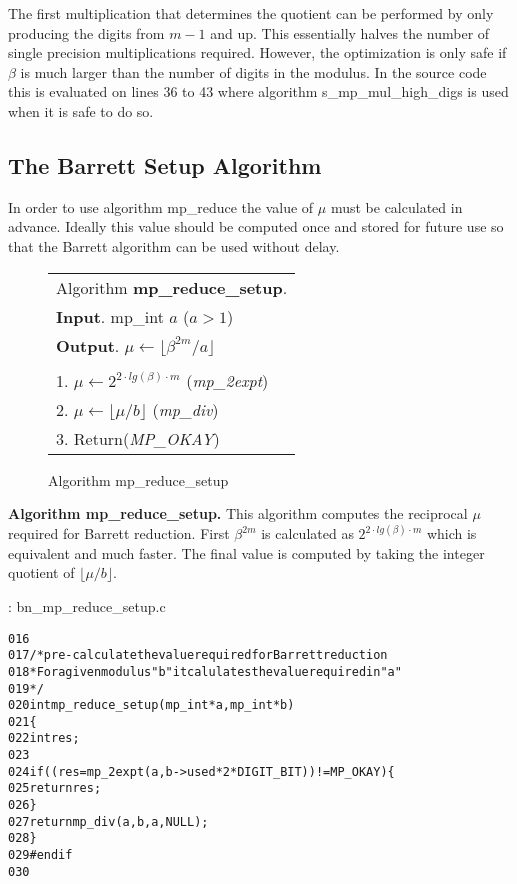 \documentclass[b5paper]{book}
\begin{document}
The first multiplication that determines the quotient can be performed by only producing the digits from $m - 1$ and up.  This essentially halves
the number of single precision multiplications required.  However, the optimization is only safe if $\beta$ is much larger than the number of digits
in the modulus.  In the source code this is evaluated on lines 36 to 43 where algorithm s\_mp\_mul\_high\_digs is used when it is
safe to do so.  

\subsection{The Barrett Setup Algorithm}
In order to use algorithm mp\_reduce the value of $\mu$ must be calculated in advance.  Ideally this value should be computed once and stored for
future use so that the Barrett algorithm can be used without delay.  

\newpage\begin{figure}[!here]
\begin{small}
\begin{center}
\begin{tabular}{l}
\hline Algorithm \textbf{mp\_reduce\_setup}. \\
\textbf{Input}.   mp\_int $a$ ($a > 1$)  \\
\textbf{Output}.  $\mu \leftarrow \lfloor \beta^{2m}/a \rfloor$ \\
\hline \\
1.  $\mu \leftarrow 2^{2 \cdot lg(\beta) \cdot  m}$ (\textit{mp\_2expt}) \\
2.  $\mu \leftarrow \lfloor \mu / b \rfloor$ (\textit{mp\_div}) \\
3.  Return(\textit{MP\_OKAY}) \\
\hline
\end{tabular}
\end{center}
\end{small}
\caption{Algorithm mp\_reduce\_setup}
\end{figure}

\textbf{Algorithm mp\_reduce\_setup.}
This algorithm computes the reciprocal $\mu$ required for Barrett reduction.  First $\beta^{2m}$ is calculated as $2^{2 \cdot lg(\beta) \cdot  m}$ which
is equivalent and much faster.  The final value is computed by taking the integer quotient of $\lfloor \mu / b \rfloor$.

\vspace{+3mm}\begin{small}
\hspace{-5.1mm}{\bf File}: bn\_mp\_reduce\_setup.c
\vspace{-3mm}
\begin{alltt}
016   
017   /* pre-calculate the value required for Barrett reduction
018    * For a given modulus "b" it calulates the value required in "a"
019    */
020   int mp_reduce_setup (mp_int * a, mp_int * b)
021   \{
022     int     res;
023     
024     if ((res = mp_2expt (a, b->used * 2 * DIGIT_BIT)) != MP_OKAY) \{
025       return res;
026     \}
027     return mp_div (a, b, a, NULL);
028   \}
029   #endif
030   
\end{alltt}
\end{small}
\end{document}
